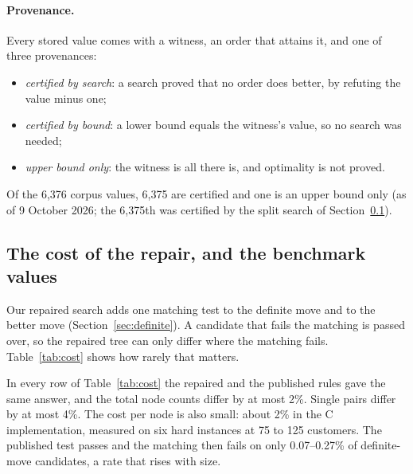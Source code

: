 \paragraph{Provenance.} Every stored value comes with a witness, an order that
attains it, and one of three provenances:
\begin{itemize}
\item \emph{certified by search}: a search proved that no order does better,
  by refuting the value minus one;
\item \emph{certified by bound}: a lower bound equals the witness's value, so
  no search was needed;
\item \emph{upper bound only}: the witness is all there is, and optimality is
  not proved.
\end{itemize}
Of the 6,376 corpus values, 6,375 are certified and one is an upper bound only
(as of 9 October 2026; the 6,375th was certified by the split search of
Section~\ref{sec:practice}).

\subsection{The cost of the repair, and the benchmark values}
\label{sec:practice}

Our repaired search adds one matching test to the definite move and to the
better move (Section~\ref{sec:definite}). A candidate that fails the matching
is passed over, so the repaired tree can only differ where the matching fails.
Table~\ref{tab:cost} shows how rarely that matters.

\begin{table}[t]
\centering\small
\caption{The repair never changed an answer and changes the total node count
by at most 2\%. Each pair runs the same question under the published and the
repaired rules in one worker. Totals are over the pairs that finished under
both rules; a pair stopped by its budget says nothing about cost.
\emph{Vertices}: customers in the open-stacks rows (the vertices of $G_M$).
\emph{Largest pair ratio}: the largest ratio of repaired to published nodes
over single pairs. Open-stacks pairs refute the optimum minus one, at 600\,s per
call at 50--100 customers and $2\times10^8$ nodes at 125. The graph pairs run
whole descents on VSPLIB, the colouring and named graphs, and a sample of 500
Rome graphs.}
\label{tab:cost}
\resizebox{\linewidth}{!}{}
\end{table}

In every row of Table~\ref{tab:cost} the repaired and the published rules gave
the same answer, and the total node counts differ by at most 2\%. Single pairs
differ by at most 4\%. The cost per node is also small: about 2\% in the C
implementation, measured on six hard instances at 75 to 125 customers. The
published test passes and the matching then fails on only 0.07--0.27\% of
definite-move candidates, a rate that rises with size.

